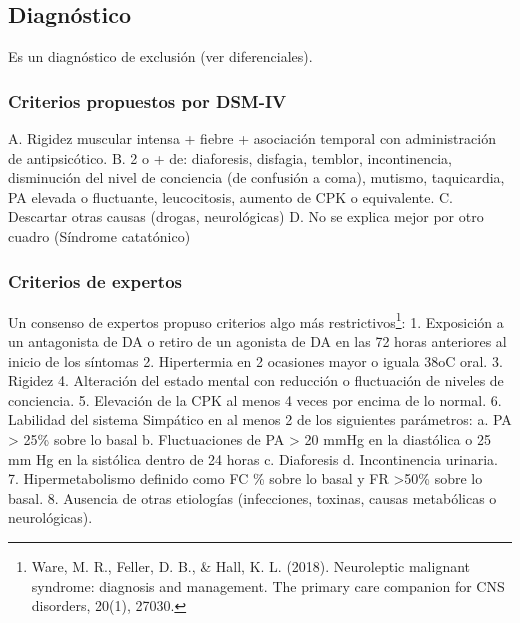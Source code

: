 \subsection*{Diagnóstico}
Es un diagnóstico de exclusión (ver diferenciales).
\subsubsection*{Criterios propuestos por DSM-IV}
A. Rigidez muscular intensa + fiebre + asociación temporal con administración de antipsicótico.
B. 2 o + de: diaforesis, disfagia, temblor, incontinencia, disminución del nivel de conciencia (de confusión a coma), mutismo, taquicardia, PA elevada o fluctuante, leucocitosis, aumento de CPK o equivalente.
C. Descartar otras causas (drogas, neurológicas)
D. No se explica mejor por otro cuadro (Síndrome catatónico)
\subsubsection*{Criterios de expertos}
Un consenso de expertos propuso criterios algo más restrictivos\footnote{Ware, M. R., Feller, D. B., \& Hall, K. L. (2018). Neuroleptic malignant syndrome: diagnosis and management. The primary care companion for CNS disorders, 20(1), 27030.}:
1. Exposición a un antagonista de DA o retiro de un agonista de DA en las 72 horas anteriores al inicio de los síntomas
2. Hipertermia en 2 ocasiones mayor o iguala 38oC oral.
3. Rigidez
4. Alteración del estado mental con reducción o fluctuación de niveles de conciencia.
5. Elevación de la CPK al menos 4 veces por encima de lo normal.
6. Labilidad del sistema Simpático en al menos 2 de los siguientes parámetros:
a. PA > 25\% sobre lo basal
b. Fluctuaciones de PA > 20 mmHg en la diastólica o 25 mm Hg en la sistólica dentro de 24 horas
c. Diaforesis
d. Incontinencia urinaria.
7. Hipermetabolismo definido como FC \% sobre lo basal y FR \faArrowUp >50\% sobre lo basal.
8. Ausencia de otras etiologías (infecciones, toxinas, causas metabólicas o neurológicas).
